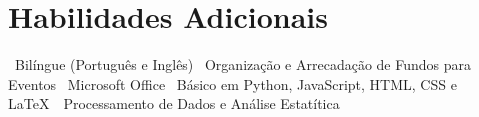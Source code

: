 \documentclass[11pt, a4paper]{article}
\begin{document}







\section*{Habilidades Adicionais}

	\textbullet \ Bilíngue (Português e Inglês) \textbullet \ Organização e Arrecadação de Fundos para Eventos  \textbullet \ Microsoft Office \textbullet \ Básico em Python, JavaScript, HTML, CSS e \LaTeX\ \textbullet \ Processamento de Dados e Análise Estatítica
\end{document}
